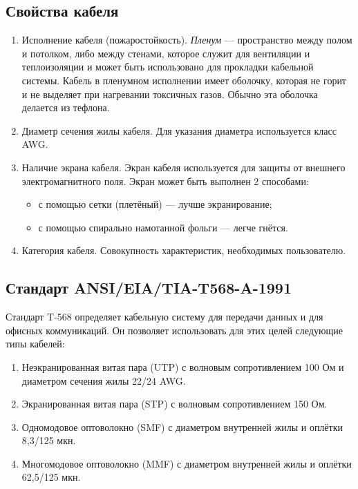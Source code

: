 \documentclass[12pt, russian, oneside, article]{ncc}
\begin{document}
\subsection{Свойства кабеля}
\label{sec-4_1}


\begin{enumerate}
\item Исполнение кабеля (пожаростойкость). \emph{Пленум} --- пространство между полом и потолком, либо между стенами, которое служит для вентиляции и теплоизоляции и может быть использовано для прокладки кабельной системы. Кабель в пленумном исполнении имеет оболочку, которая не горит и не выделяет при нагревании токсичных газов. Обычно эта оболочка делается из тефлона.
\item Диаметр сечения жилы кабеля. Для указания диаметра используется класс AWG.
\item Наличие экрана кабеля. Экран кабеля используется для защиты от внешнего электромагнитного поля. Экран может быть выполнен 2 способами:

\begin{itemize}
\item с помощью сетки (плетёный) --- лучше экранирование;
\item с помощью спирально намотанной фольги --- легче гнётся.
\end{itemize}

\item Категория кабеля. Совокупность характеристик, необходимых пользователю.
\end{enumerate}
\subsection{Стандарт ANSI/EIA/TIA-T568-A-1991}
\label{sec-4_2}


Стандарт T-568 определяет кабельную систему для передачи данных и для офисных коммуникаций. Он позволяет использовать для этих целей следующие типы кабелей:
\begin{enumerate}
\item Неэкранированная витая пара (UTP) с волновым сопротивлением 100 Ом и диаметром сечения жилы 22/24 AWG.
\item Экранированная витая пара (STP) с волновым сопротивлением 150 Ом.
\item Одномодовое оптоволокно (SMF) с диаметром внутренней жилы и оплётки 8,3/125 мкн.
\item Многомодовое оптоволокно (MMF) с диаметром внутренней жилы и оплётки 62,5/125 мкн.
\end{enumerate}
\end{document}
